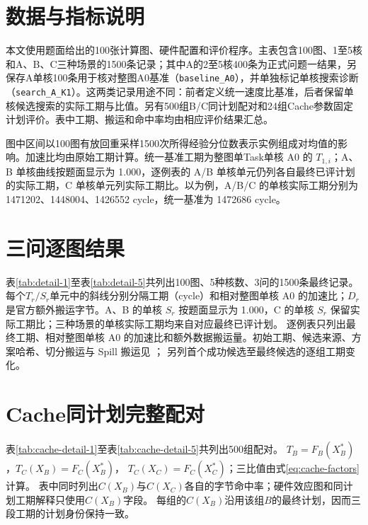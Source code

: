 \appendix
{}

\section{数据与指标说明}\label{app:provenance}
本文使用题面给出的100张计算图、硬件配置和评价程序。主表包含100图、1至5核和A、B、C三种场景的1500条记录；其中A的2至5核400条为正式问题一结果，另保存A单核100条用于核对整图A0基准（\texttt{baseline\_A0}），并单独标记单核搜索诊断（\texttt{search\_A\_K1}）。这两类记录用途不同：前者定义统一速度比基准，后者保留单核候选搜索的实际工期与比值。另有500组B/C同计划配对和24组Cache参数固定计划评价。表中工期、搬运和命中率均由相应评价结果汇总。

图中区间以100图有放回重采样1500次所得经验分位数表示实例组成对均值的影响。加速比均由原始工期计算。统一基准工期为整图单Task单核 A0 的 $T_{1,i}$；A、B 单核曲线按题面显示为 1.000，逐例表的 A/B 单核单元仍列各自最终已评计划的实际工期，C 单核单元列实际工期比。以为例，A/B/C 的单核实际工期分别为 1471202、1448004、1426552 cycle，统一基准为 1472686 cycle。

\section{三问逐图结果}\label{app:results}
表\ref{tab:detail-1}至表\ref{tab:detail-5}共列出100图、5种核数、3问的1500条最终记录。
每个$T_r/S_r$单元中的斜线分别分隔工期（cycle）和相对整图单核 A0 的加速比；$D_r$是官方额外搬运字节。A、B 的单核 $S_r$ 按题面显示为 1.000，C 的单核 $S_r$ 保留实际工期比；三种场景的单核实际工期均来自对应最终已评计划。
逐例表只列出最终工期、相对整图单核 A0 的加速比和额外数据搬运量。初始工期、候选来源、方案哈希、切分搬运与 Spill 搬运见 ； 另列首个成功候选至最终候选的逐组工期变化。
\begingroup
\small
\setlength{\tabcolsep}{2.5pt}
\setlength{\LTleft}{\fill}\setlength{\LTright}{\fill}
\renewcommand{\arraystretch}{1.03}

\endgroup

\section{Cache同计划完整配对}\label{app:cache}
表\ref{tab:cache-detail-1}至表\ref{tab:cache-detail-5}共列出500组配对。
$T_B=F_B(X_B^*)$，$T_C(X_B)=F_C(X_B^*)$，
$T_C(X_C)=F_C(X_C^*)$；三比值由式\eqref{eq:cache-factors}计算。
表中同时列出$C(X_B)$与$C(X_C)$各自的字节命中率；硬件效应图和同计划工期解释只使用$C(X_B)$字段。
每组的$C(X_B)$沿用该组$B$的最终计划，因而三段工期的计划身份保持一致。
\begingroup
\scriptsize
\setlength{\tabcolsep}{2pt}
\setlength{\LTleft}{\fill}\setlength{\LTright}{\fill}
\renewcommand{\arraystretch}{1.03}

\endgroup

